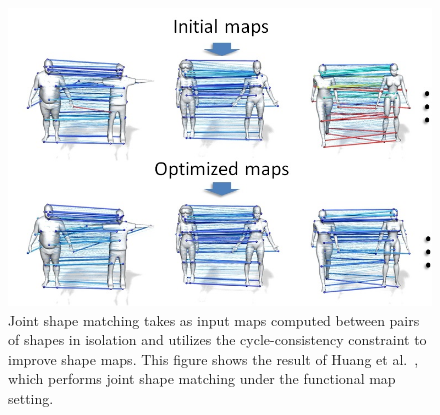 \begin{figure}[t]
\centering
    \includegraphics[width=1.0\columnwidth]{fig/img/huang_sig14_jsm.png}
    \caption{Joint shape matching takes as input maps computed between pairs of shapes in isolation and utilizes the cycle-consistency constraint to improve shape maps. This figure shows the result of Huang et al.~\protect\cite{Huang:2014:FMN}, which performs joint shape matching under the functional map setting.}
    \label{fig:huang_sig14_jsm}
\end{figure}

